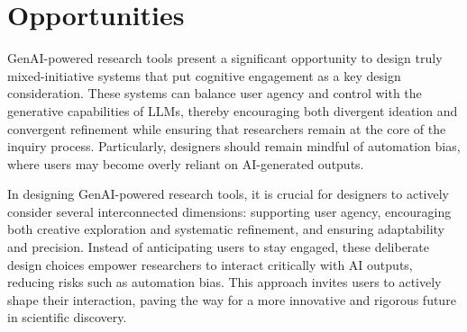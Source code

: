 \section{Opportunities}
\label{sec:oppotunities}


GenAI-powered research tools present a significant opportunity to design truly mixed-initiative systems that put cognitive engagement as a key design consideration. These systems can balance user agency and control with the generative capabilities of LLMs, thereby encouraging both divergent ideation and convergent refinement while ensuring that researchers remain at the core of the inquiry process. Particularly, designers should remain mindful of automation bias, where users may become overly reliant on AI-generated outputs. 

In designing GenAI-powered research tools, it is crucial for designers to actively consider several interconnected dimensions: supporting user agency, encouraging both creative exploration and systematic refinement, and ensuring adaptability and precision. Instead of anticipating users to stay engaged, these deliberate design choices empower researchers to interact critically with AI outputs, reducing risks such as automation bias. This approach invites users to actively shape their interaction, paving the way for a more innovative and rigorous future in scientific discovery.